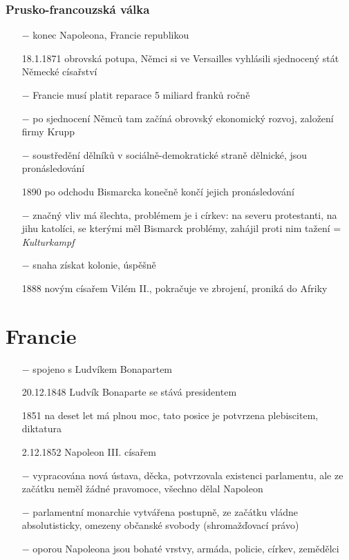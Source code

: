\documentclass{article}
\begin{document}
\subsubsection*{Prusko-francouzská válka}
\begin{itemize}
    \vspace{-0.5em}
    \setlength\itemsep{0.15em}
    \item[$-$] konec Napoleona, Francie republikou
    \item[18.1.1871] obrovská potupa, Němci si ve Versailles vyhlásili sjednocený stát Německé císařství
    \item[$-$] Francie musí platit reparace 5 miliard franků ročně
\end{itemize}

\begin{itemize}
    \vspace{-0.5em}
    \setlength\itemsep{0.15em}
    \item[$-$] po sjednocení Němců tam začíná obrovský ekonomický rozvoj, založení firmy Krupp
    \item[$-$] soustředění dělníků v sociálně-demokratické straně dělnické, jsou pronásledování
    \item[1890] po odchodu Bismarcka konečně končí jejich pronásledování
    \item[$-$] značný vliv má šlechta, problémem je i církev: na severu protestanti, na jihu katolíci, se kterými měl Bismarck problémy, zahájil proti nim tažení = \textit{Kulturkampf}
    \item[$-$] snaha získat kolonie, úspěšně
    \item[1888] novým císařem Vilém II., pokračuje ve zbrojení, proniká do Afriky
\end{itemize}

\section*{Francie}


\begin{itemize}
    \vspace{-0.5em}
    \setlength\itemsep{0.15em}
    \item[$-$] spojeno s Ludvíkem Bonapartem
    \item[20.12.1848] Ludvík Bonaparte se stává presidentem
    \item[1851] na deset let má plnou moc, tato posice je potvrzena plebiscitem, diktatura
    \item[2.12.1852] Napoleon III. císařem
    \item[$-$] vypracována nová ústava, děcka, potvrzovala existenci parlamentu, ale ze začátku neměl žádné pravomoce, všechno dělal Napoleon
    \item[$-$] parlamentní monarchie vytvářena postupně, ze začátku vládne absolutisticky, omezeny občanské svobody (shromažďovací právo)
    \item[$-$] oporou Napoleona jsou bohaté vrstvy, armáda, policie, církev, zemědělci
\end{itemize}
\end{document}
